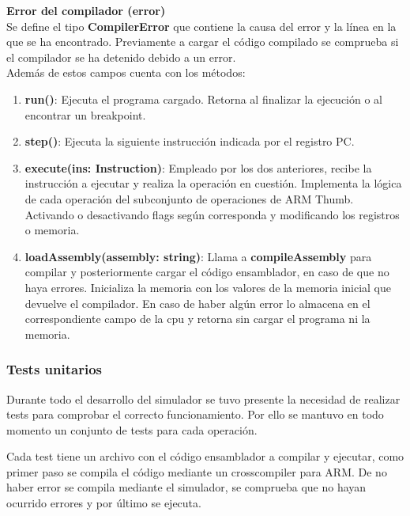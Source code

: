 {        \textbf{Error del compilador (error)} \\
        Se define el tipo \textbf{CompilerError} que contiene la causa del error y la línea en la que se ha encontrado.
        Previamente a cargar el código compilado se comprueba si el compilador se ha detenido debido a un error. \\

        Además de estos campos cuenta con los métodos:
        \begin{enumerate}
            \item \textbf{run()}: Ejecuta el programa cargado. Retorna al finalizar la ejecución o al encontrar un breakpoint.
            \item \textbf{step()}: Ejecuta la siguiente instrucción indicada por el registro PC.
            \item \textbf{execute(ins: Instruction)}: Empleado por los dos anteriores, recibe la instrucción a ejecutar y realiza la operación en cuestión.
                Implementa la lógica de cada operación del subconjunto de operaciones de ARM Thumb.
                Activando o desactivando flags según corresponda y modificando los registros o memoria.
            \item \textbf{loadAssembly(assembly: string)}: Llama a \textbf{compileAssembly} para compilar y posteriormente cargar el código ensamblador, en caso de que no haya errores.
                Inicializa la memoria con los valores de la memoria inicial que devuelve el compilador. En caso de haber algún error lo almacena en el correspondiente campo de la cpu
                y retorna sin cargar el programa ni la memoria.
        \end{enumerate}

        \subsubsection{Tests unitarios}
        Durante todo el desarrollo del simulador se tuvo presente la necesidad de realizar tests
        para comprobar el correcto funcionamiento. Por ello se mantuvo en todo momento un conjunto de tests para cada operación.
        
        Cada test tiene un archivo con el código ensamblador a compilar y ejecutar, como primer paso se compila el código
        mediante un crosscompiler para ARM. De no haber error se compila mediante el simulador, se comprueba que no hayan ocurrido errores y por
        último se ejecuta.

}
